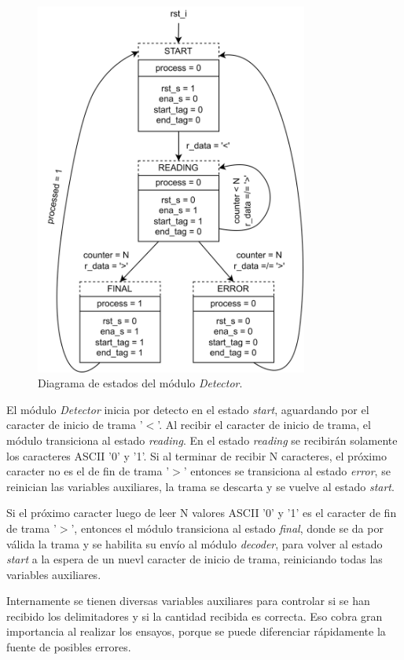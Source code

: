 	\begin{figure}[H]
		\centering
		\includegraphics[width=0.8\textwidth]{Figuras/Detector_FSMD.png}
		\centering\caption{Diagrama de estados del módulo \textit{Detector}.}
		\label{fig:Detector_FSMD}
	\end{figure}
	
	El módulo \textit{Detector} inicia por detecto en el estado \textit{start}, aguardando por el caracter de inicio de trama '$<$'. Al recibir el caracter de inicio de trama, el módulo transiciona al estado \textit{reading}. En el estado \textit{reading} se recibirán solamente los caracteres ASCII '0' y '1'. Si al terminar de recibir N caracteres, el próximo caracter no es el de fin de trama '$>$' entonces se transiciona al estado \textit{error}, se reinician las variables auxiliares, la trama se descarta y se vuelve al estado \textit{start}.
	
	Si el próximo caracter luego de leer N valores ASCII '0' y '1' es el caracter de fin de trama '$>$', entonces el módulo transiciona al estado \textit{final}, donde se da por válida la trama y se habilita su envío al módulo \textit{decoder}, para volver al estado \textit{start} a la espera de un nuevl caracter de inicio de trama, reiniciando todas las variables auxiliares.
	
	Internamente se tienen diversas variables auxiliares para controlar si se han recibido los delimitadores y si la cantidad recibida es correcta. Eso cobra gran importancia al realizar los ensayos, porque se puede diferenciar rápidamente la fuente de posibles errores.